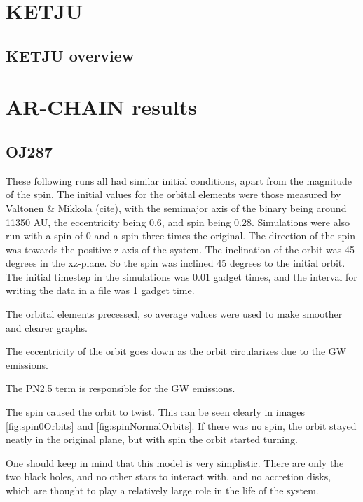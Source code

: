 \documentclass[english, oneside]{HYgradu}
\begin{document}
\chapter{KETJU}
\section{KETJU overview}
\section{}
\section{}

\chapter{AR-CHAIN results}
\section{OJ287}

These following runs all had similar initial conditions, apart from the magnitude of the spin. The initial values for the orbital elements were those measured by Valtonen \& Mikkola (cite), with the semimajor axis of the binary being around 11350 AU, the eccentricity being 0.6, and spin being 0.28. Simulations were also run with a spin of 0 and a spin three times the original. The direction of the spin was towards the positive z-axis of the system. The inclination of the orbit was 45 degrees in the xz-plane. So the spin was inclined 45 degrees to the initial orbit. The initial timestep in the simulations was 0.01 gadget times, and the interval for writing the data in a file was 1 gadget time. 

The orbital elements precessed, so average values were used to make smoother and clearer graphs. 

The eccentricity of the orbit goes down as the orbit circularizes due to the GW emissions.

The PN2.5 term is responsible for the GW emissions.

The spin caused the orbit to twist. This can be seen clearly in images \ref{fig:spin0Orbits} and \ref{fig:spinNormalOrbits}. If there was no spin, the orbit stayed neatly in the original plane, but with spin the orbit started turning.

One should keep in mind that this model is very simplistic. There are only the two black holes, and no other stars to interact with, and no accretion disks, which are thought to play a relatively large role in the life of the system.
\end{document}
